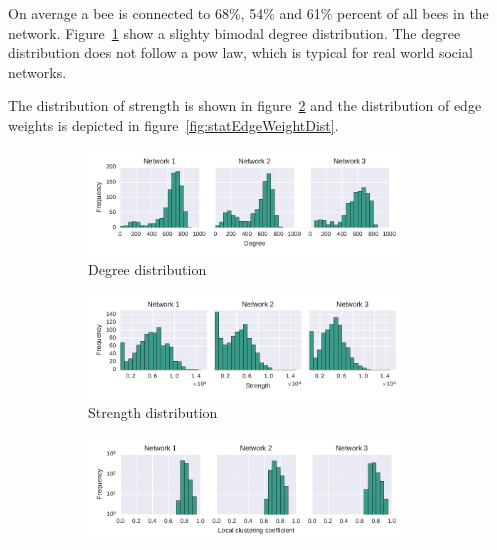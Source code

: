 On average a bee is connected to 68\%, 54\% and 61\% percent of all bees in the network. Figure~\ref{fig:statDegreeDist} show a slighty bimodal degree distribution. The degree distribution does not follow a pow law, which is typical for real world social networks. 

The distribution of strength is shown in figure~\ref{fig:statStrengthDist} and the distribution of edge weights is depicted in figure~\ref{fig:statEdgeWeightDist}.

\begin{figure}[!t]
	\centering
	\begin{subfigure}[b]{1.0\textwidth}
	\centering
	\includegraphics[width=0.92\textwidth]{Figures/stat-degreeDist}
	\caption[Degree distribution]{Degree distribution}
	\label{fig:statDegreeDist}
	\end{subfigure} 
	\begin{subfigure}[b]{1.0\textwidth}
	\centering
	\includegraphics[width=0.92\textwidth]{Figures/stat-strengthDist}
	\caption[Strength distribution]{Strength distribution}
	\label{fig:statStrengthDist}
	\end{subfigure}
	\begin{subfigure}[b]{1.0\textwidth}
	\centering
	\includegraphics[width=0.92\textwidth]{Figures/stat-lccDist}

\end{subfigure}
\end{figure}
